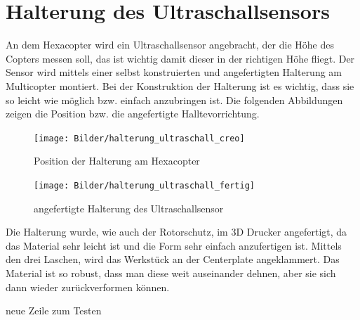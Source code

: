 \section{Halterung des Ultraschallsensors}
An dem Hexacopter wird ein Ultraschallsensor angebracht, der die Höhe des Copters messen soll, das ist wichtig damit dieser in der richtigen Höhe fliegt. Der Sensor wird mittels einer selbst konstruierten und angefertigten Halterung am Multicopter montiert.
Bei der Konstruktion der Halterung ist es wichtig, dass sie so leicht wie möglich bzw. einfach anzubringen ist. Die folgenden Abbildungen zeigen die Position bzw. die angefertigte Halltevorrichtung.

\begin{figure}[htb]
\begin{centering}
\texttt{[image: Bilder/halterung\_ultraschall\_creo]}
\par\end{centering}
\caption{Position der Halterung am Hexacopter}
\label{Halterung des Ultraschallsensor}
\end{figure}

\begin{figure}[htb]
\begin{centering}
\texttt{[image: Bilder/halterung\_ultraschall\_fertig]}
\par\end{centering}
\caption{angefertigte Halterung des Ultraschallsensor}
\label{Halterung des Ultraschallsensor}
\end{figure}

Die Halterung wurde, wie auch der Rotorschutz, im 3D Drucker angefertigt, da das Material sehr leicht ist und die Form sehr einfach anzufertigen ist. Mittels den drei Laschen, wird das Werkstück an der Centerplate angeklammert.
Das Material ist so robust, dass man diese weit auseinander dehnen, aber sie sich dann wieder zurückverformen können. 

neue Zeile zum Testen
